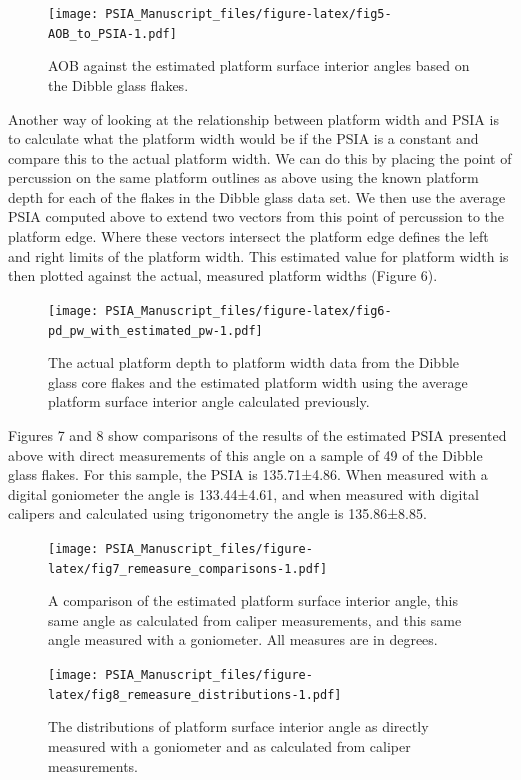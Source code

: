 \documentclass[10pt,letterpaper]{article}
\begin{document}
\begin{figure}
\centering
\texttt{[image: PSIA\_Manuscript\_files/figure-latex/fig5-AOB\_to\_PSIA-1.pdf]}
\caption{AOB against the estimated platform surface interior angles
based on the Dibble glass flakes.}
\end{figure}

Another way of looking at the relationship between platform width and
PSIA is to calculate what the platform width would be if the PSIA is a
constant and compare this to the actual platform width. We can do this
by placing the point of percussion on the same platform outlines as
above using the known platform depth for each of the flakes in the
Dibble glass data set. We then use the average PSIA computed above to
extend two vectors from this point of percussion to the platform edge.
Where these vectors intersect the platform edge defines the left and
right limits of the platform width. This estimated value for platform
width is then plotted against the actual, measured platform widths
(Figure 6).

\begin{figure}
\centering
\texttt{[image: PSIA\_Manuscript\_files/figure-latex/fig6-pd\_pw\_with\_estimated\_pw-1.pdf]}
\caption{The actual platform depth to platform width data from the
Dibble glass core flakes and the estimated platform width using the
average platform surface interior angle calculated previously.}
\end{figure}

Figures 7 and 8 show comparisons of the results of the estimated PSIA
presented above with direct measurements of this angle on a sample of 49
of the Dibble glass flakes. For this sample, the PSIA is 135.71±4.86.
When measured with a digital goniometer the angle is 133.44±4.61, and
when measured with digital calipers and calculated using trigonometry
the angle is 135.86±8.85.

\begin{figure}
\centering
\texttt{[image: PSIA\_Manuscript\_files/figure-latex/fig7\_remeasure\_comparisons-1.pdf]}
\caption{A comparison of the estimated platform surface interior angle,
this same angle as calculated from caliper measurements, and this same
angle measured with a goniometer. All measures are in degrees.}
\end{figure}

\begin{figure}
\centering
\texttt{[image: PSIA\_Manuscript\_files/figure-latex/fig8\_remeasure\_distributions-1.pdf]}
\caption{The distributions of platform surface interior angle as
directly measured with a goniometer and as calculated from caliper
measurements.}
\end{figure}
\end{document}
